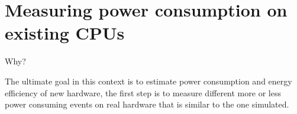 \section{Measuring power consumption on existing CPUs}



Why?

The ultimate goal in this context is to estimate power consumption and energy efficiency
of new hardware, the first step is to measure different more or less power consuming events on
real hardware that is similar to the one simulated.


